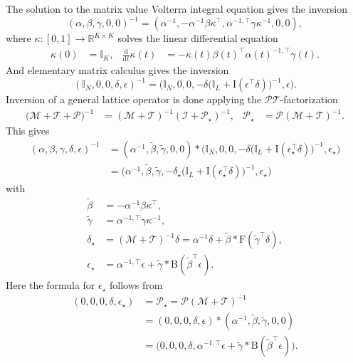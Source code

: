 \documentclass[12pt,a4paper]{article}
\newcommand{\Rset}{\mathbb{R}}
\newcommand{\df}{\text{d}}
\newcommand{\Iop}{\mathcal{I}}
\newcommand{\Mop}{\mathcal{M}}
\newcommand{\Top}{\mathcal{T}}
\newcommand{\Pop}{\mathcal{P}}
\begin{document}
The solution to the matrix value Volterra integral equation gives the inversion
\begin{equation*}
(\alpha,\beta,\gamma,0,0)^{-1} = (\alpha^{-1}, -\alpha^{-1} \beta \kappa^\top, \alpha^{-1,\top} \gamma \kappa^{-1}, 0,0), 
\end{equation*}
where $\kappa\colon [0,1] \to \Rset^{K \times K}$ solves the linear differential equation
\begin{align*}
\kappa(0) &= \mathbb{I}_K, &
\tfrac{\df}{\df t} \kappa(t) &= -\kappa(t) \beta(t)^\top \alpha(t)^{-1,\top} \gamma(t).
\end{align*}
And elementary matrix calculus gives the inversion
\begin{equation*}
(\mathbb{I}_N,0,0,\delta,\epsilon)^{-1} = \Big( \mathbb{I}_N, 0,0, -\delta \big( \mathbb{I}_L + \mathrm{I}(\epsilon^\top \delta) \big)^{-1}, \epsilon \Big).
\end{equation*}
Inversion of a general lattice operator is done applying the $\Pop\Top$-factorization
\begin{align*}
\big( \Mop + \Top + \Pop \big)^{-1} &= (\Mop + \Top)^{-1} (\Iop+\Pop_\star)^{-1}, & \Pop_\star &= \Pop (\Mop+\Top)^{-1}.
\end{align*}
This gives
\begin{align*}
(\alpha,\beta,\gamma,\delta,\epsilon)^{-1} &=
(\alpha^{-1}, \tilde{\beta}, \tilde{\gamma},0,0) * \big( \mathbb{I}_N,0,0, -\delta \big( \mathbb{I}_L + \mathrm{I}(\epsilon_\star^\top \delta) \big)^{-1}, \epsilon_\star \big) \\
&= \big(\alpha^{-1}, \tilde{\beta}, \tilde{\gamma}, -\delta_\star \big( \mathbb{I}_L + \mathrm{I}(\epsilon_\star^\top \delta) \big)^{-1}, \epsilon_\star \big)
\end{align*}
with
\begin{equation} \label{eq:inversion}
\begin{aligned}
\tilde{\beta} &= -\alpha^{-1} \beta \kappa^\top, \\
\tilde{\gamma} &= \alpha^{-1,\top} \gamma \kappa^{-1}, \\
\delta_\star &= (\Mop + \Top)^{-1} \delta =\alpha^{-1} \delta + \tilde{\beta} * \mathrm{F}(\tilde{\gamma}^\top \delta), \\
\epsilon_\star &= \alpha^{-1,\top} \epsilon + \tilde{\gamma} * \mathrm{B}(\tilde{\beta}^\top \epsilon).
\end{aligned}
\end{equation}
Here the formula for $\epsilon_\star$ follows from
\begin{align*}
(0,0,0,\delta,\epsilon_\star) &= \Pop_\star = \Pop (\Mop + \Top)^{-1} \\ 
&=(0,0,0,\delta,\epsilon) * (\alpha^{-1}, \tilde{\beta}, \tilde{\gamma}, 0,0) \\
&= \big(0,0,0,\delta, \alpha^{-1,\top} \epsilon + \tilde{\gamma} * \mathrm{B}(\tilde{\beta}^\top \epsilon) \big).
\end{align*}
\end{document}
